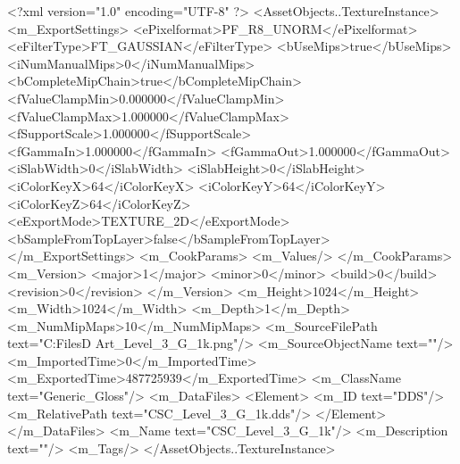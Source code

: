 <?xml version="1.0" encoding="UTF-8" ?>
<AssetObjects..TextureInstance>
	<m_ExportSettings>
		<ePixelformat>PF_R8_UNORM</ePixelformat>
		<eFilterType>FT_GAUSSIAN</eFilterType>
		<bUseMips>true</bUseMips>
		<iNumManualMips>0</iNumManualMips>
		<bCompleteMipChain>true</bCompleteMipChain>
		<fValueClampMin>0.000000</fValueClampMin>
		<fValueClampMax>1.000000</fValueClampMax>
		<fSupportScale>1.000000</fSupportScale>
		<fGammaIn>1.000000</fGammaIn>
		<fGammaOut>1.000000</fGammaOut>
		<iSlabWidth>0</iSlabWidth>
		<iSlabHeight>0</iSlabHeight>
		<iColorKeyX>64</iColorKeyX>
		<iColorKeyY>64</iColorKeyY>
		<iColorKeyZ>64</iColorKeyZ>
		<eExportMode>TEXTURE_2D</eExportMode>
		<bSampleFromTopLayer>false</bSampleFromTopLayer>
	</m_ExportSettings>
	<m_CookParams>
		<m_Values/>
	</m_CookParams>
	<m_Version>
		<major>1</major>
		<minor>0</minor>
		<build>0</build>
		<revision>0</revision>
	</m_Version>
	<m_Height>1024</m_Height>
	<m_Width>1024</m_Width>
	<m_Depth>1</m_Depth>
	<m_NumMipMaps>10</m_NumMipMaps>
	<m_SourceFilePath text="C:\Users\Shadow\Desktop\Working Files\3D Art\CSC_Level_3_G_1k.png"/>
	<m_SourceObjectName text=""/>
	<m_ImportedTime>0</m_ImportedTime>
	<m_ExportedTime>487725939</m_ExportedTime>
	<m_ClassName text="Generic_Gloss"/>
	<m_DataFiles>
		<Element>
			<m_ID text="DDS"/>
			<m_RelativePath text="CSC_Level_3_G_1k.dds"/>
		</Element>
	</m_DataFiles>
	<m_Name text="CSC_Level_3_G_1k"/>
	<m_Description text=""/>
	<m_Tags/>
</AssetObjects..TextureInstance>

